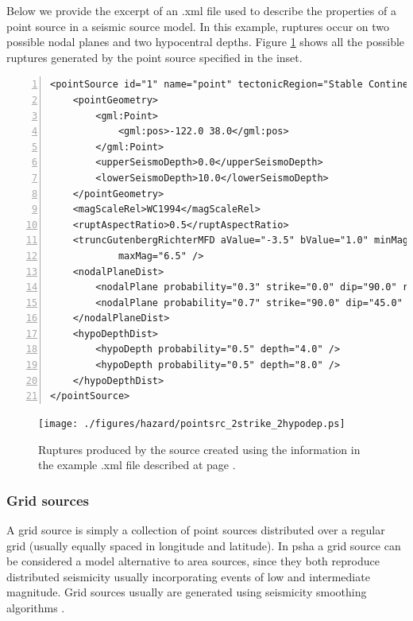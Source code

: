 Below we provide the excerpt of an .xml file used to describe the 
properties of a point source in a seismic source model.
In this example, ruptures occur on two possible nodal planes and two 
hypocentral depths. Figure \ref{fig:point_source_ruptures} shows all 
the possible ruptures generated by the point source specified in the 
inset.
\label{page:xml_point}
\begin{Verbatim}[frame=single, commandchars=\\\{\}, fontsize=\footnotesize,
    numbers=left, numbersep=2pt]
<pointSource id="1" name="point" tectonicRegion="Stable Continental Crust">
    <pointGeometry>
        <gml:Point>
            <gml:pos>-122.0 38.0</gml:pos>
        </gml:Point>
        <upperSeismoDepth>0.0</upperSeismoDepth>
        <lowerSeismoDepth>10.0</lowerSeismoDepth>
    </pointGeometry>
    <magScaleRel>WC1994</magScaleRel>
    <ruptAspectRatio>0.5</ruptAspectRatio>
    <truncGutenbergRichterMFD aValue="-3.5" bValue="1.0" minMag="5.0" 
			maxMag="6.5" />
    <nodalPlaneDist>
        <nodalPlane probability="0.3" strike="0.0" dip="90.0" rake="0.0" />
        <nodalPlane probability="0.7" strike="90.0" dip="45.0" rake="90.0" />
    </nodalPlaneDist>
    <hypoDepthDist>
        <hypoDepth probability="0.5" depth="4.0" />
        <hypoDepth probability="0.5" depth="8.0" />
    </hypoDepthDist>
</pointSource>
\end{Verbatim}
\begin{figure}[!ht]
\centering
\texttt{[image: ./figures/hazard/pointsrc\_2strike\_2hypodep.ps]}
\caption{Ruptures produced by the source created using the information 
    in the example .xml file described at page \pageref{page:xml_point}.}
\label{fig:point_source_ruptures}
\end{figure}
%
\subsubsection{Grid sources}
\label{hazard:seismic_source_types:gridSources}
% 
A grid source is simply a collection of
point sources distributed over a regular grid (usually equally spaced in 
longitude and latitude).
%
In \gls{psha} a grid source can be considered a model alternative to area 
sources, since they both reproduce distributed seismicity usually 
incorporating events of low and intermediate magnitude. 
%
Grid sources usually are generated using seismicity smoothing algorithms 
\citep[][amongst many others]{frankel1995,woo1996}. 

